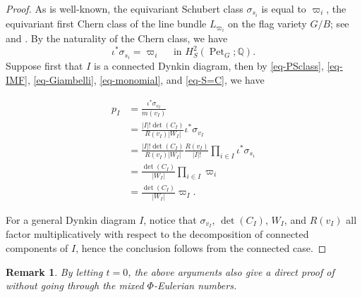 \documentclass[11pt, letterpaper]{amsart}
\numberwithin{equation}{section}
\newtheorem{remark}[theorem]{Remark}
\DeclareMathOperator{\Pet}{Pet}
\begin{document}
\begin{proof}
   As is well-known, the equivariant Schubert class $\sigma_{s_i}$ is equal to $\varpi_{i}$, the equivariant first Chern class of the line bundle $L_{\varpi_{i}}$ on the flag variety $G/B$; see \cite{bernstein1973schubert} and \cite{harada2015equivariant}. By the naturality of the Chern class, we have 
   \begin{equation} \label{eq-S=C}
      \iota^* \sigma_{s_i}=\varpi_i \quad \text { in } H_S^{2}(\Pet_{G};\mathbb{Q}). 
   \end{equation}
   Suppose first that $I$ is a connected Dynkin diagram, then by \eqref{eq-PSclass}, \eqref{eq-IMF}, \eqref{eq-Giambelli}, \eqref{eq-monomial}, and \eqref{eq-S=C}, we have
 
       \begin{align*}
p_I&=\frac{\iota^* \sigma_{v_I}}{m\left(v_I\right)}\\
&=\frac{|I|!\operatorname{det}\left(C_I\right)}{R\left(v_I\right)\left|W_I\right|}\iota^* \sigma_{v_I}\\
&=\frac{|I|!\operatorname{det}\left(C_I\right)}{R\left(v_I\right)\left|W_I\right|}\frac{R\left(v_I\right)}{|I|!} \prod_{i \in I} \iota^* \sigma_{s_i}\\
&=\frac{\operatorname{det}\left(C_I\right)}{\left|W_I\right|}\prod_{i \in I}\varpi_i\\
&=\frac{\operatorname{det}\left(C_I\right)}{\left|W_I\right|} \varpi_I.
       \end{align*}
 

For a general Dynkin diagram $I$, notice that $\sigma_{v_I}$, $\operatorname{det}\left(C_I\right)$, $W_I$, and $R\left(v_I\right)$ all factor multiplicatively with respect to the decomposition of connected components of $I$, hence the conclusion follows from the connected case. 
\end{proof}

\begin{remark}
    By letting $t=0$, the above arguments also give a direct proof of \cite[Theorem 1.1.(3)]{Horiguchi2024mixed} without going through the mixed $\Phi$-Eulerian numbers.
\end{remark}
\end{document}
